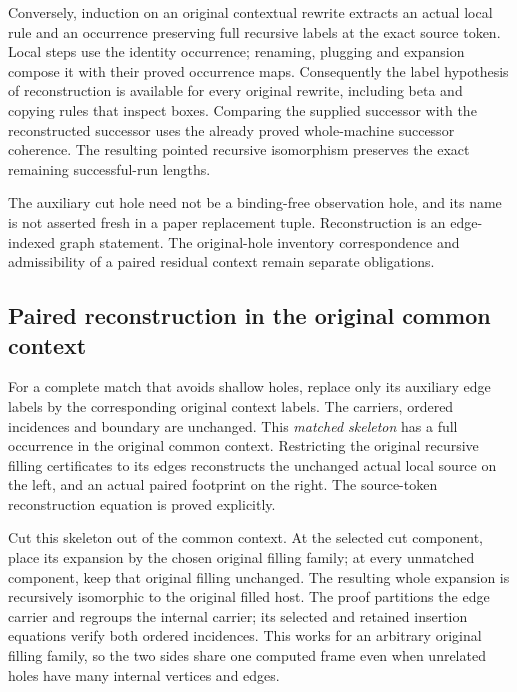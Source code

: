 Conversely, induction on an original contextual rewrite extracts an actual
local rule and an occurrence preserving full recursive labels at the exact
source token. Local steps use the identity occurrence; renaming, plugging
and expansion compose it with their proved occurrence maps. Consequently
the label hypothesis of reconstruction is available for every original
rewrite, including beta and copying rules that inspect boxes. Comparing the supplied
successor with the reconstructed successor uses the already proved
whole-machine successor coherence. The resulting pointed recursive
isomorphism preserves the exact remaining successful-run lengths.

The auxiliary cut hole need not be a binding-free observation hole, and its
name is not asserted fresh in a paper replacement tuple. Reconstruction is
an edge-indexed graph statement. The original-hole inventory correspondence
and admissibility of a paired residual context remain separate obligations.

\subsection{Paired reconstruction in the original common context}
For a complete match that avoids shallow holes, replace only its auxiliary
edge labels by the corresponding original context labels. The carriers,
ordered incidences and boundary are unchanged. This \emph{matched skeleton}
has a full occurrence in the original common context. Restricting the
original recursive filling certificates to its edges reconstructs the
unchanged actual local source on the left, and an actual paired footprint
on the right. The source-token reconstruction equation is proved explicitly.

Cut this skeleton out of the common context. At the selected cut component,
place its expansion by the chosen original filling family; at every
unmatched component, keep that original filling unchanged. The resulting
whole expansion is recursively isomorphic to the original filled host.
The proof partitions the edge carrier and regroups the internal carrier;
its selected and retained insertion equations verify both ordered
incidences. This works for an arbitrary original filling family, so the
two sides share one computed frame even when unrelated holes have many
internal vertices and edges.

